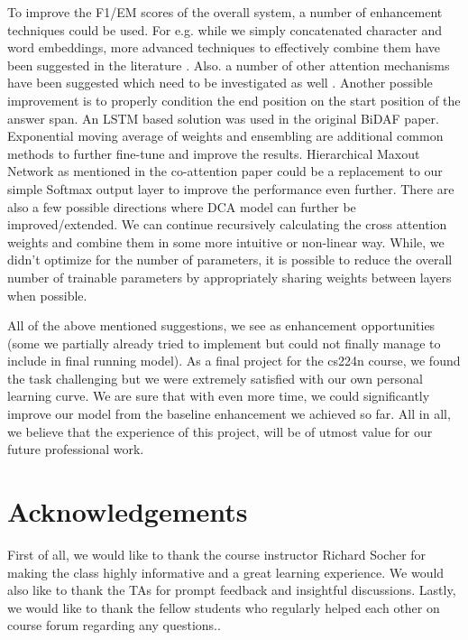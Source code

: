 \documentclass{article} %
\begin{document}
To improve the F1/EM scores of the overall system, a number of enhancement techniques could be used. For e.g. while we simply concatenated character and word embeddings, more advanced techniques to effectively combine them have been suggested in the literature \cite{gating}. Also. a number of other attention mechanisms have been suggested which need to be investigated as well \cite{match, aoa}. Another possible improvement is to properly condition the end position on the start position of the answer span. An LSTM based solution was used in the original BiDAF paper. Exponential moving average of weights and ensembling are additional common methods to further fine-tune and improve the results. Hierarchical Maxout Network as mentioned in the co-attention paper could be a replacement to our simple Softmax output layer to improve the performance even further. There are also a few possible directions where DCA model can further be improved/extended. We can continue recursively calculating the cross attention weights and combine them in some more intuitive or non-linear way. While, we didn't optimize for the number of parameters, it is possible to reduce the overall number of trainable parameters by appropriately sharing weights between layers when possible.

All of the above mentioned suggestions, we see as enhancement opportunities (some we partially already tried to implement but could not finally manage to include in final running model). As a final project for the cs224n course, we found the task challenging but we were extremely satisfied with our own personal learning curve. We are sure that with even more time, we could significantly improve our model from the baseline enhancement we achieved so far. All in all, we believe that the experience of this project, will be of utmost value for our future professional work. 

%
%
%
%


\section*{Acknowledgements}
First of all, we would like to thank the course instructor Richard Socher for making the class highly informative and a great learning experience. We would also like to thank the TAs for prompt feedback and insightful discussions. Lastly, we would like to thank the fellow students who regularly helped each other on course forum regarding any questions.. 
\end{document}
